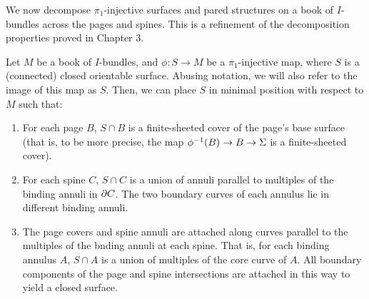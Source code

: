 We now decompose $\pi_1$-injective surfaces and pared structures on a book of
$I$-bundles across the pages and spines. This is a refinement of the
decomposition properties proved in Chapter 3.

\begin{lemma}\label{L:sfcdecomp}

Let $M$ be a book of $I$-bundles, and $\phi\colon S \to M$ be
a $\pi_1$-injective map, where $S$ is a (connected) closed orientable surface.
Abusing notation, we will also refer to the image of this map as $S$. Then, we
can place $S$ in minimal position with respect to $M$ such that:

\begin{enumerate}

\item For each page $B$, $S \cap B$ is a finite-sheeted cover of the page's
base surface (that is, to be more precise, the map $\phi^{-1}(B) \to B \to \Sigma$
is a finite-sheeted cover).

\item For each spine $C$, $S \cap C$ is a union of annuli parallel to multiples
of the binding annuli in $\partial C$. The two boundary curves of each annulus lie
in different binding annuli.

\item The page covers and spine annuli are attached along curves parallel to
the multiples of the bnding annuli at each spine. That is, for each binding
annulus $A$, $S \cap A$ is a union of multiples of the core curve of $A$. All
boundary components of the page and spine intersections are attached in this
way to yield a closed surface.

\end{enumerate}

\end{lemma}

